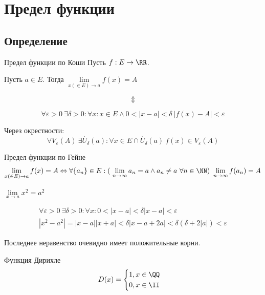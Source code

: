 \section{Предел функции}

\subsection{Определение}

\begin{defn}{Предел функции по Коши}{}
    Пусть \( f : E \to \RR \).

    Пусть \( a \in E \). 
    Тогда \( \lim\limits_{x (\in E) \to a} f(x) = A \)

    \[
        \Updownarrow
    \]

    \[
        \forall \varepsilon > 0 \ \exists \delta > 0 : \forall x : x \in E \land 0 < |x - a| < \delta \ |f(x) - A| < \varepsilon
    \]

    Через окрестности:
    \[
        \forall V_{\varepsilon}(A) \ \exists \mathring{U_\delta} (a) : 
        \forall x \in E \cap \mathring{U_\delta} (a) \ f(x) \in V_{\varepsilon} (A)
    \]
\end{defn}

\begin{defn}{Предел функции по Гейне}{}
    \[
        \lim\limits_{x (\in E) \to a} f(x) = A
        \Leftrightarrow
        \forall \{ a_n \} \in E : ( \ \lim\limits_{n \to \infty} a_n = a \land a_n \neq a \ \forall n \in \NN ) 
        \ \lim\limits_{n \to \infty} f(a_n) = A
    \]
\end{defn}

\begin{example}{}{}
    \( \lim\limits_{x \to a} x^2 = a^2 \)
\end{example}
\begin{gather*}
    \forall \varepsilon > 0 \ \exists \delta > 0 : \forall x : 0 < |x - a| < \delta |x - a| < \varepsilon
    \\
    |x^2 - a^2| = |x - a||x + a| < \delta |x - a + 2a| < \delta(\delta + 2|a|) < \varepsilon
\end{gather*}

Последнее неравенство очевидно имеет положительные корни.
\begin{example}{Функция Дирихле}{}
    \[
        D(x) 
        =
        \begin{cases}
            1, x \in \QQ
            \\
            0, x \in \II
        \end{cases}
    \]
\end{example}

